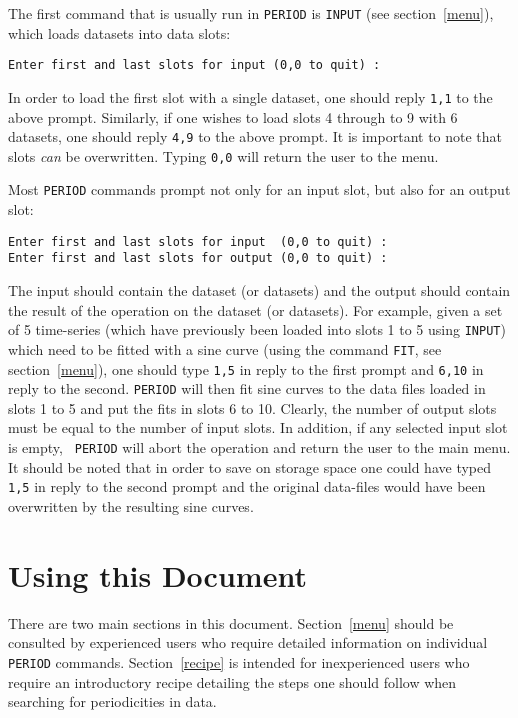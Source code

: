 The first command that is usually run in {\tt PERIOD} is {\tt INPUT}
(see section~\ref{menu}), which loads datasets into data slots:

\begin{verbatim}
Enter first and last slots for input (0,0 to quit) : 
\end{verbatim}

In order to load the first slot with a single dataset, one should reply 
{\tt 1,1} to the above prompt. Similarly, if one wishes to load slots
4 through to 9 with 6 datasets, one should reply {\tt 4,9} to the above
prompt. It is important to note that slots {\em can} be overwritten.
Typing {\tt 0,0} will return the user to the menu. 

Most {\tt PERIOD} commands prompt not only for an input slot, but also for
an output slot:

\begin{verbatim}
Enter first and last slots for input  (0,0 to quit) : 
Enter first and last slots for output (0,0 to quit) : 
\end{verbatim}

The input should contain the dataset (or datasets) and the output should
contain the result of the operation on the dataset (or datasets). For example,
given a set of 5 time-series (which have previously been loaded into slots 1 to
5 using {\tt INPUT}) which need to be fitted with a sine curve (using the
command {\tt FIT}, see section~\ref{menu}), one should type {\tt 1,5} in reply
to the first prompt and {\tt 6,10} in reply to the second. {\tt PERIOD} will
then fit sine curves to the data files loaded in slots 1 to 5 and put the fits
in slots 6 to 10. Clearly, the number of output slots must be equal to the
number of input slots. In addition, if any selected input slot is empty, {\tt
PERIOD} will abort the operation and return the user to the main menu. It should
be noted that in order to save on storage space one could have typed {\tt 1,5} 
in reply to the second prompt and the original data-files would have been 
overwritten by the resulting sine curves.

\section{Using this Document}

There are two main sections in this document. Section~\ref{menu} should be
consulted by experienced users who require detailed information on individual
{\tt PERIOD} commands. Section~\ref{recipe} is intended for inexperienced 
users who require an introductory recipe detailing the steps one should 
follow when searching for periodicities in data. 

